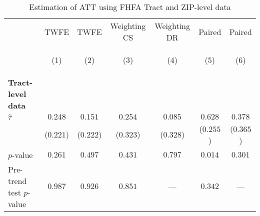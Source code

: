 
        \begin{table}[tbh]
        \caption{Estimation of ATT using FHFA Tract and ZIP-level data}
        \label{tab:tract_and_zip}
        \scriptsize
        \centering
        \vspace{1em}
        \begin{threeparttable}
        \begin{tabular}{lcccccc}
\toprule
{} &                                     TWFE &                                    TWFE  &                             Weighting CS &                             Weighting DR &                                   Paired &                                  Paired  \\
{} & \hypertarget{tabcol:tract_and_zip1}{(1)} & \hypertarget{tabcol:tract_and_zip2}{(2)} & \hypertarget{tabcol:tract_and_zip3}{(3)} & \hypertarget{tabcol:tract_and_zip4}{(4)} & \hypertarget{tabcol:tract_and_zip5}{(5)} & \hypertarget{tabcol:tract_and_zip6}{(6)} \\
\midrule
\textbf{Tract-level data}        &                                          &                                          &                                          &                                          &                                          &                                          \\
\quad $\hat\tau$                 &                                  $0.248$ &                                  $0.151$ &                                  $0.254$ &                                  $0.085$ &                                  $0.628$ &                                  $0.378$ \\
\quad                            &                                ($0.221$) &                                ($0.222$) &                                ($0.323$) &                                ($0.328$) &                                ($0.255$) &                                ($0.365$) \\
\quad $p$-value                  &                                  $0.261$ &                                  $0.497$ &                                  $0.431$ &                                  $0.797$ &                                  $0.014$ &                                  $0.301$ \\
\quad Pre-trend test $p$-value   &                                  $0.987$ &                                  $0.926$ &                                  $0.851$ &                                      --- &                                  $0.342$ &                                      --- \\

\end{tabular}
\end{threeparttable}
\end{table}

